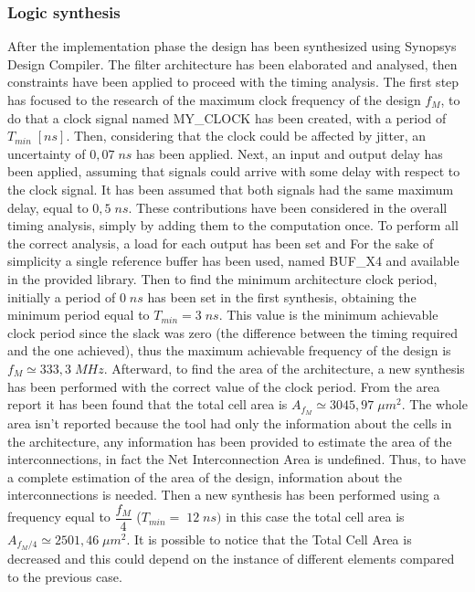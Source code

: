 \documentclass[a4paper, titlepage]{article}
\begin{document}
\subsubsection{Logic synthesis}
After the implementation phase the design has been synthesized using Synopsys Design Compiler. The filter architecture has been elaborated and analysed, then constraints have been applied to proceed with the timing analysis.
\newline
The first step has focused to the research of the maximum clock frequency of the design $f_{M}$, to do that a clock signal named MY\_CLOCK has been created, with a period of $T_{min} \;[ns]$. Then, considering that the clock could be affected by jitter, an uncertainty of $0,07 \; ns$ has been applied. Next, an input and output delay has been applied, assuming that signals could arrive with some delay with respect to the clock signal. It has been assumed that both signals had the same maximum delay, equal to $0,5 \; ns$. These contributions have been considered in the overall timing analysis, simply by adding them to the computation once.
\newline
To perform all the correct analysis, a load for each output has been set and For the sake of simplicity a single reference buffer has been used, named BUF\_X4 and available in the provided library.
\newline
Then to find the minimum architecture clock period, initially a period of $0\; ns$ has been set in the first synthesis, obtaining the minimum period equal to $T_{min}=3\; ns$.  This value is the minimum achievable clock period  since the slack was zero (the difference between the timing required and the one achieved), thus the maximum achievable frequency of the design is $f_M \simeq 333,3 \;MHz$.
\newline 
Afterward, to find the area of the architecture, a new synthesis has been performed with the correct value of the clock period. 
From the area report it has been found that the total cell area is $A_{f_M}\simeq3045,97 \; \mu m ^2$. 
\newline 
The whole area isn't reported because the tool had only the information about the cells in the architecture, any information has been provided to estimate the area of the interconnections, in fact the Net Interconnection Area is undefined. Thus, to have a complete estimation of the area of the design, information about the interconnections is needed.
\newline
Then a new synthesis has been performed using a frequency equal to $\dfrac{f_M}{4}$ ($T_{min}= \;12 \;ns)$ in this case the total cell area is $A_{f_M/4}\simeq2501,46\; \mu m ^2$. It is possible to notice that the Total Cell Area is decreased and this could depend on the instance of different elements compared to the previous case.
\end{document}
